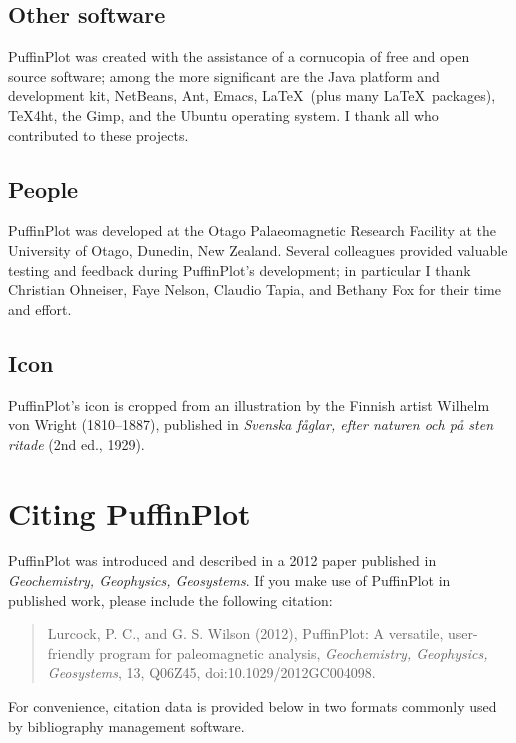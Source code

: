 \documentclass[a4paper,british]{article}
\begin{document}
\subsection*{Other software}

PuffinPlot was created with the assistance of a cornucopia of free and open
source software; among the more significant are the Java platform and
development kit, NetBeans, Ant, Emacs, \LaTeX\ (plus many \LaTeX\ packages),
TeX4ht, the Gimp, and the Ubuntu operating system. I thank all who
contributed to these projects.

\subsection*{People}

PuffinPlot was developed at the Otago Palaeomagnetic Research Facility at the
University of Otago, Dunedin, New Zealand. Several colleagues provided
valuable testing and feedback during PuffinPlot's development; in particular
I thank Christian Ohneiser, Faye Nelson, Claudio Tapia, and Bethany Fox for
their time and effort.

\subsection*{Icon}

PuffinPlot's icon is cropped from an illustration by the Finnish artist
Wilhelm von Wright (1810--1887), published in \emph{Svenska f\aa glar, efter
  naturen och p\aa{} sten ritade} (2nd ed., 1929).

\appendix
\section{Citing PuffinPlot\label{sec:citing-puffinplot}}

PuffinPlot was introduced and described in a 2012 paper published
in \emph{Geochemistry, Geophysics, Geosystems}. If you make use of
PuffinPlot in published work, please include the following citation:

\begin{quote}
Lurcock, P. C., and G. S. Wilson (2012), PuffinPlot: A versatile,
user-friendly program for paleomagnetic analysis, \emph{Geochemistry,
  Geophysics, Geosystems}, 13, Q06Z45, doi:10.1029/2012GC004098.
\end{quote}

\noindent For convenience, citation data is provided below in two formats
commonly used by bibliography management software.
\end{document}
